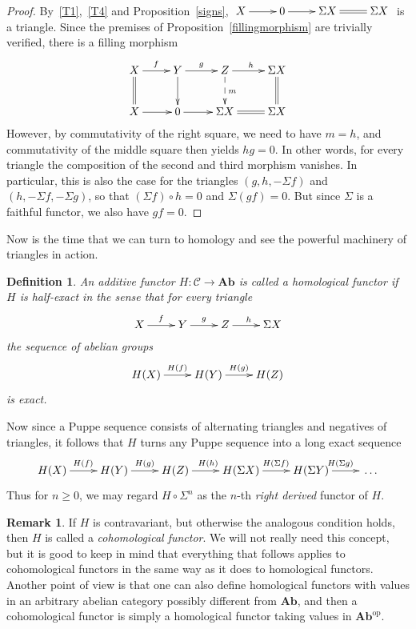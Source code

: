 \documentclass{amsproc}
\newtheorem{defn}[prop]{Definition}
\theoremstyle{definition}
\newtheorem{rem}[prop]{Remark}
\begin{document}
\begin{proof}
By~\ref{T1},~\ref{T4} and Proposition~\ref{signs}, $\xymatrix{X\ar[r] & 0\ar[r] & {}\Sigma X\ar@{=}[r] & {}\Sigma X}$ is a triangle. Since the premises of Proposition~\ref{fillingmorphism} are trivially verified, there is a filling morphism
\begin{displaymath}
\xymatrix{X\ar[r]^f\ar@{=}[d] & Y\ar[r]^g\ar[d] & Z\ar[r]^h\ar@{-->}[d]^m & {}\Sigma X\ar@{=}[d]\\
X\ar[r] & 0\ar[r] & \Sigma X\ar@{=}[r] & {}\Sigma X}
\end{displaymath}
However, by commutativity of the right square, we need to have $m=h$, and commutativity of the middle square then yields $hg=0$. In other words, for every triangle the composition of the second and third morphism vanishes. In particular, this is also the case for the triangles $(g,h,-\Sigma f)$ and $(h,-\Sigma f,-\Sigma g)$, so that $(\Sigma f)\circ h=0$ and $\Sigma(gf)=0$. But since $\Sigma$ is a faithful functor, we also have $gf=0$.
\end{proof}

Now is the time that we can turn to homology and see the powerful machinery of triangles in action.

\begin{defn}
An additive functor $H:{\mathcal{C}}{\longrightarrow}{\mathbf{Ab}}$ is called a \emph{homological functor} if $H$ is \emph{half-exact} in the sense that for every triangle
\begin{displaymath}
\xymatrix{X\ar[r]^f & Y\ar[r]^g & Z\ar[r]^h & {}\Sigma X}
\end{displaymath}
the sequence of abelian groups
\begin{displaymath}
\xymatrix{H(X)\ar[r]^{H(f)} & H(Y)\ar[r]^{H(g)} & H(Z)}
\end{displaymath}
is exact.
\end{defn}

Now since a Puppe sequence consists of alternating triangles and negatives of triangles, it follows that $H$ turns any Puppe sequence into a long exact sequence
\begin{displaymath}
\xymatrix{H(X)\ar[r]^{H(f)} & H(Y)\ar[r]^{H(g)} & H(Z)\ar[r]^{H(h)} & H(\Sigma X)\ar[r]^{H(\Sigma f)} & H(\Sigma Y)\ar[r]^{H(\Sigma g)} & {}\ldots}
\end{displaymath}
Thus for $n\geq 0$, we may regard $H\circ\Sigma^n$ as the $n$-th \emph{right derived} functor of $H$.

\begin{rem}
	If $H$ is contravariant, but otherwise the analogous condition holds, then $H$ is called a \emph{cohomological functor}. We will not really need this concept, but it is good to keep in mind that everything that follows applies to cohomological functors in the same way as it does to homological functors. Another point of view is that one can also define homological functors with values in an arbitrary abelian category possibly different from ${\mathbf{Ab}}$, and then a cohomological functor is simply a homological functor taking values in ${\mathbf{Ab}}^{\mathrm{op}}$.
\end{rem}
\end{document}
